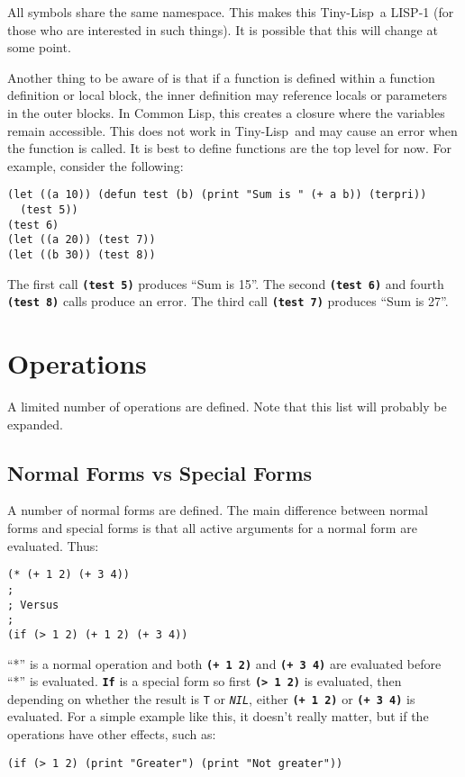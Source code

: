 \documentclass[10pt, openany]{book}
\newcommand{\operation}[1]{\textbf{\texttt{#1}}}
\newcommand{\function}[1]{\texttt{#1}}
\newcommand{\constant}[1]{\emph{\texttt{#1}}}
\newcommand{\tl}{Tiny-Lisp}
\newcommand{\cl}{Common Lisp}
\begin{document}
All symbols share the same namespace.  This makes this \tl\ a LISP-1 (for those who are interested in such things).  It is possible that this will change at some point.

Another thing to be aware of is that if a function is defined within a function definition or local block, the inner definition may reference locals or parameters in the outer blocks.  In \cl, this creates a closure where the variables remain accessible.  This does not work in \tl\ and may cause an error when the function is called.  It is best to define functions are the top level for now.  For example, consider the following:
\begin{lstlisting}
(let ((a 10)) (defun test (b) (print "Sum is " (+ a b)) (terpri))
  (test 5))
(test 6)
(let ((a 20)) (test 7))
(let ((b 30)) (test 8))
\end{lstlisting}

The first call \operation{(test 5)} produces ``Sum is  15''.  The second \operation{(test 6)} and fourth \operation{(test 8)} calls produce an error.  The third call \operation{(test 7)} produces ``Sum is  27''.

\section{Operations}
A limited number of operations are defined.  Note that this list will probably be expanded.

\subsection{Normal Forms vs Special Forms}
A number of normal forms are defined.  The main difference between normal forms and special forms is that all active arguments for a normal form are evaluated.  Thus:
\begin{lstlisting}
(* (+ 1 2) (+ 3 4))
;
; Versus
;
(if (> 1 2) (+ 1 2) (+ 3 4))
\end{lstlisting}
``*'' is a normal operation and both \operation{(+ 1 2)} and \operation{(+ 3 4)} are evaluated before ``*'' is evaluated.  \operation{If} is a special form so first \operation{(> 1 2)} is evaluated, then depending on whether the result is \function{T} or \constant{NIL}, either \operation{(+ 1 2)} or \operation{(+ 3 4)} is evaluated.  For a simple example like this, it doesn't really matter, but if the operations have other effects, such as:

\begin{lstlisting}
(if (> 1 2) (print "Greater") (print "Not greater"))
\end{lstlisting}
\end{document}
